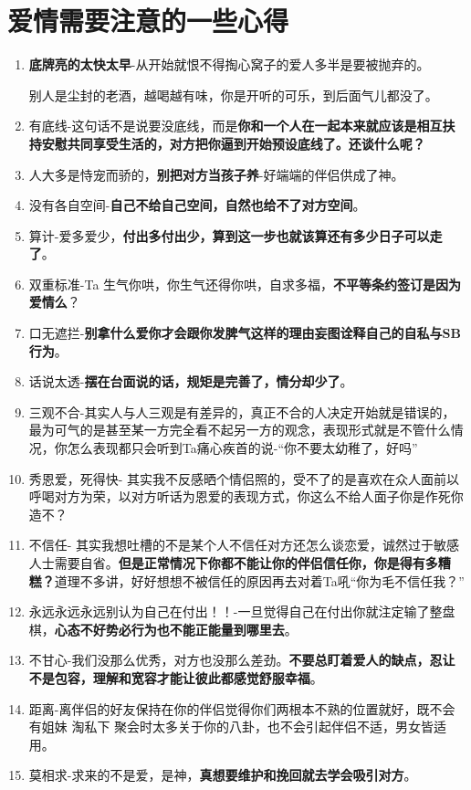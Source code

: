 \documentclass[UTF8,a4paper,8pt]{ctexbook}
\begin{document}
\section{爱情需要注意的一些心得}
	\begin{enumerate}
		\item \textbf{底牌亮的太快太早}-从开始就恨不得掏心窝子的爱人多半是要被抛弃的。
		
			别人是尘封的老酒，越喝越有味，你是开听的可乐，到后面气儿都没了。
		\item 有底线-这句话不是说要没底线，而是\textbf{你和一个人在一起本来就应该是相互扶持安慰共同享受生活的，对方把你逼到开始预设底线了。还谈什么呢？}
		
		\item 人大多是恃宠而骄的，\textbf{别把对方当孩子养}-好端端的伴侣供成了神。
		
		\item 没有各自空间-\textbf{自己不给自己空间，自然也给不了对方空间}。
		 
		\item 算计-爱多爱少，\textbf{付出多付出少，算到这一步也就该算还有多少日子可以走了}。
		
		\item 双重标准-Ta 生气你哄，你生气还得你哄，自求多福，\textbf{不平等条约签订是因为爱情么}？
		
		\item 口无遮拦-\textbf{别拿什么爱你才会跟你发脾气这样的理由妄图诠释自己的自私与SB行为}。
		
		\item 话说太透-\textbf{摆在台面说的话，规矩是完善了，情分却少了}。
		
		\item 三观不合-其实人与人三观是有差异的，真正不合的人决定开始就是错误的，最为可气的是甚至某一方完全看不起另一方的观念，表现形式就是不管什么情况，你怎么表现都只会听到Ta痛心疾首的说-“你不要太幼稚了，好吗”
		
		\item 秀恩爱，死得快- 其实我不反感晒个情侣照的，受不了的是喜欢在众人面前以呼喝对方为荣，以对方听话为恩爱的表现方式，你这么不给人面子你是作死你造不？
		
		\item 不信任- 其实我想吐槽的不是某个人不信任对方还怎么谈恋爱，诚然过于敏感人士需要自省。\textbf{但是正常情况下你都不能让你的伴侣信任你，你是得有多糟糕？}道理不多讲，好好想想不被信任的原因再去对着Ta吼“你为毛不信任我？”
		
		\item 永远永远永远别认为自己在付出！！-一旦觉得自己在付出你就注定输了整盘棋，\textbf{心态不好势必行为也不能正能量到哪里去}。
		
		\item 不甘心-我们没那么优秀，对方也没那么差劲。\textbf{不要总盯着爱人的缺点，忍让不是包容，理解和宽容才能让彼此都感觉舒服幸福}。
		
		\item 距离-离伴侣的好友保持在你的伴侣觉得你们两根本不熟的位置就好，既不会有姐妹 淘私下 聚会时太多关于你的八卦，也不会引起伴侣不适，男女皆适用。
		
		\item 莫相求-求来的不是爱，是神，\textbf{真想要维护和挽回就去学会吸引对方}。
	\end{enumerate}
	
\end{document}
